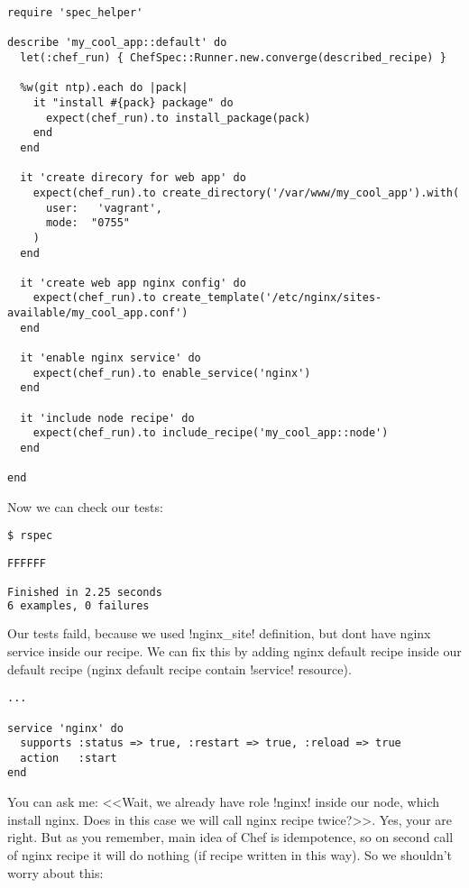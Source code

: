 \begin{lstlisting}[label=lst:testing-chefspec3,title=my-server-cloud/site-cookbooks/my\_cool\_app/spec/unit/recipes/default\_spec.rb]
require 'spec_helper'

describe 'my_cool_app::default' do
  let(:chef_run) { ChefSpec::Runner.new.converge(described_recipe) }

  %w(git ntp).each do |pack|
    it "install #{pack} package" do
      expect(chef_run).to install_package(pack)
    end
  end

  it 'create direcory for web app' do
    expect(chef_run).to create_directory('/var/www/my_cool_app').with(
      user:   'vagrant',
      mode:  "0755"
    )
  end

  it 'create web app nginx config' do
    expect(chef_run).to create_template('/etc/nginx/sites-available/my_cool_app.conf')
  end

  it 'enable nginx service' do
    expect(chef_run).to enable_service('nginx')
  end

  it 'include node recipe' do
    expect(chef_run).to include_recipe('my_cool_app::node')
  end

end
\end{lstlisting}

Now we can check our tests:

\begin{lstlisting}[language=Bash,label=lst:testing-chefspec5]
$ rspec

FFFFFF

Finished in 2.25 seconds
6 examples, 0 failures
\end{lstlisting}

Our tests faild, because we used \inline!nginx_site! definition, but dont have nginx service inside our recipe. We can fix this by adding nginx default recipe inside our default recipe (nginx default recipe contain \inline!service! resource).

\begin{lstlisting}[label=lst:testing-chefspec-nginx]
...

service 'nginx' do
  supports :status => true, :restart => true, :reload => true
  action   :start
end
\end{lstlisting}

You can ask me: <<Wait, we already have role \inline!nginx! inside our node, which install nginx. Does in this case we will call nginx recipe twice?>>. Yes, your are right. But as you remember, main idea of Chef is idempotence, so on second call of nginx recipe it will do nothing (if recipe written in this way). So we shouldn't worry about this:

